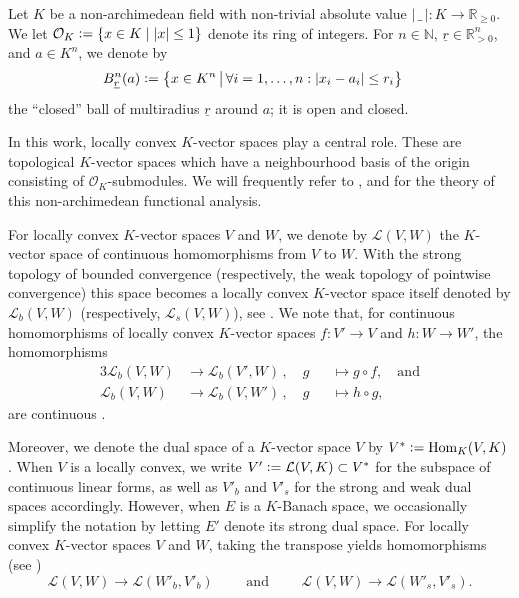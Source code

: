 \documentclass[a4paper, reqno, 10pt]{amsart}
\theoremstyle{definition}
\numberwithin{equation}{section}
\newcommand{\abs}[1]{{\lvert{#1}\rvert}}
\newcommand{\blank}{{\,\_\,}}
\newcommand{\defeq}{\vcentcolon=}
\newcommand{\Hom}{{\mathrm{Hom}}}
\newcommand{\lra}{\longrightarrow}
\newcommand{\lto}{\longmapsto}
\newcommand{\ra}{\rightarrow}
\newcommand{\ul}[1]{{\underline{#1}}}
\newcommand{\BN}{{\mathbb {N}}}
\newcommand{\BR}{{\mathbb {R}}}
\newcommand{\CL}{{\mathcal {L}}}
\newcommand{\CO}{{\mathcal {O}}}
\begin{document}
Let $K$ be a non-archimedean field with non-trivial absolute value $\abs{\blank}\colon K \ra \BR_{\geq 0}$.
We let $\CO_K \defeq \{ x \in K \mid \abs{x}\leq 1 \}$ denote its ring of integers.
For $n\in \BN$, $\ul{r}\in \BR_{>0}^n$, and $a \in K^n$, we denote by
\begin{align*}
	B^{n}_{\ul{r}}(a) &\defeq \big\{ x\in K^n \,\big\vert\, \forall i=1,\ldots,n: \abs{x_i - a_i} \leq r_i  \big\} 
\end{align*}
the ``closed'' ball of multiradius $\ul{r}$ around $a$; it is open and closed.



In this work, locally convex $K$-vector spaces play a central role.
These are topological $K$-vector spaces which have a neighbourhood basis of the origin consisting of $\CO_K$-submodules.
We will frequently refer to \cite{Emerton17LocAnVect}, \cite{PerezGarciaSchikhof10LocConvSpNonArch} and \cite{Schneider02NonArchFunctAna} for the theory of this non-archimedean functional analysis.



For locally convex $K$-vector spaces $V$ and $W$, we denote by $\CL(V,W)$ the $K$-vector space of continuous homomorphisms from $V$ to $W$.
With the strong topology of bounded convergence (respectively, the weak topology of pointwise convergence) this space becomes a locally convex $K$-vector space itself denoted by $\CL_b(V,W)$ (respectively, $\CL_s(V,W)$), see \cite[Examples p.\ 35]{Schneider02NonArchFunctAna}.
We note that, for continuous homomorphisms of locally convex $K$-vector spaces $f\colon V'\ra V$ and $h\colon W\ra W'$, the homomorphisms
\begin{alignat*}{3}
	\CL_b(V,W) &\lra \CL_b(V',W) \,,\quad g &&\lto g \circ f ,\quad \text{and}\\
	\CL_b(V,W) &\lra \CL_b(V,W') \,,\quad g &&\lto h \circ g ,
\end{alignat*}
are continuous \cite[\S 18, p.\ 113]{Schneider02NonArchFunctAna}.



Moreover, we denote the dual space of a $K$-vector space $V$ by $V^\ast \defeq \Hom_K (V,K)$.
When $V$ is a locally convex, we write $V'\defeq \CL(V,K) \subset V^\ast$ for the subspace of continuous linear forms, as well as $V'_b$ and $V'_s$ for the strong and weak dual spaces accordingly.
However, when $E$ is a $K$-Banach space, we occasionally simplify the notation by letting $E'$ denote its strong dual space.
For locally convex $K$-vector spaces $V$ and $W$, taking the transpose yields homomorphisms (see \cite[\S 0.3.8]{Emerton17LocAnVect})
\begin{equation*}
	\CL (V,W) \lra \CL(W'_b, V'_b) \qquad \text{ and } \qquad \CL(V,W) \lra \CL(W'_s, V'_s) .
\end{equation*}
\end{document}
